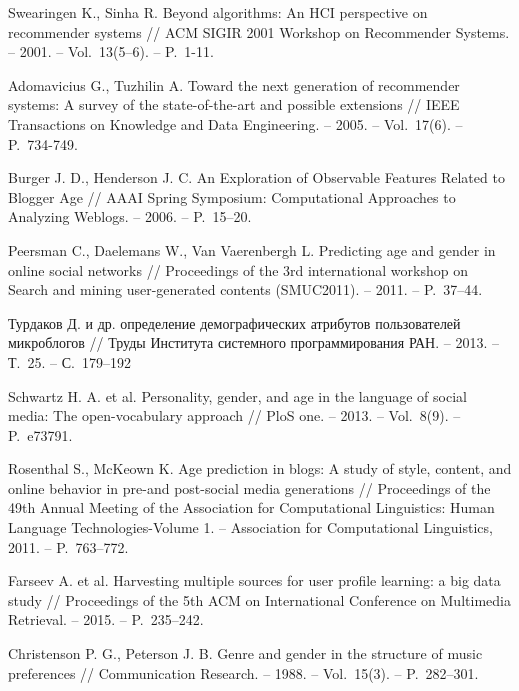 \documentclass{spisok-article}
\begin{document}
\renewcommand\refname{Литература}
\begin{thebibliography}{8}

 Swearingen K., Sinha R. Beyond algorithms:
    An HCI perspective on recommender systems // ACM SIGIR 2001 Workshop
    on Recommender Systems. – 2001. – Vol.~13(5--6). – P.~1-11.

 Adomavicius G., Tuzhilin A. Toward the
    next generation of recommender systems: A survey of the
    state-of-the-art and possible extensions // IEEE Transactions on
    Knowledge and Data Engineering. – 2005. – Vol.~17(6). – P.~734-749.

 Burger J. D., Henderson J. C.
  An Exploration of Observable Features Related to Blogger Age //
  AAAI Spring Symposium: Computational Approaches to 
  Analyzing Weblogs. – 2006. – P.~15--20.

 Peersman C., Daelemans W., Van Vaerenbergh L.
  Predicting age and gender in online social networks //
  Proceedings of the 3rd international workshop on Search
  and mining user-generated contents (SMUC2011). – 2011. – P.~37--44.

 Турдаков Д. и др. определение демографических атрибутов
  пользователей микроблогов // Труды Института системного
  программирования РАН. – 2013. – Т.~25. – С.~179--192

 Schwartz H. A. et al. Personality, gender,
  and age in the language of social media:
  The open-vocabulary approach //
  PloS one. – 2013. – Vol.~8(9). – P.~e73791.

 Rosenthal S., McKeown K. Age prediction in blogs:
  A study of style, content, and online behavior in pre-and post-social
  media generations // Proceedings of the 49th Annual Meeting of the
  Association for Computational Linguistics: Human Language 
  Technologies-Volume 1. – Association for Computational
  Linguistics, 2011. – P.~763--772.

 Farseev A. et al. Harvesting multiple sources 
  for user profile learning: a big data study // Proceedings of
  the 5th ACM on International Conference on Multimedia
  Retrieval. – 2015. – P.~235--242.

 Christenson P. G., Peterson J. B. Genre
  and gender in the structure of music preferences // Communication
  Research. – 1988. – Vol.~15(3). – P.~282--301.


\end{thebibliography}
\end{document}
